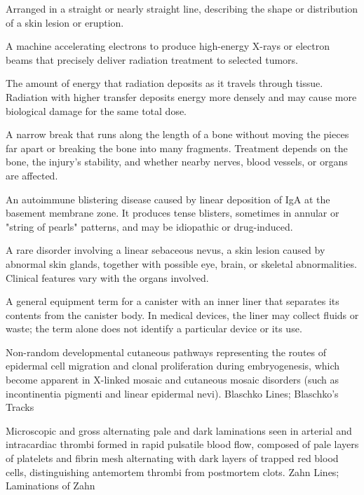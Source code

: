  Arranged in a straight or nearly straight line, describing the shape or distribution of a skin lesion or eruption.

 A machine accelerating electrons to produce high-energy X-rays or electron beams that precisely deliver radiation treatment to selected tumors.

 The amount of energy that radiation deposits as it travels through tissue. Radiation with higher transfer deposits energy more densely and may cause more biological damage for the same total dose.

 A narrow break that runs along the length of a bone without moving the pieces far apart or breaking the bone into many fragments. Treatment depends on the bone, the injury's stability, and whether nearby nerves, blood vessels, or organs are affected.

 An autoimmune blistering disease caused by linear deposition of IgA at the
basement membrane zone. It produces tense blisters, sometimes in annular or "string of pearls" patterns, and may be
idiopathic or drug-induced.

 A rare disorder involving a linear sebaceous nevus, a skin lesion caused by abnormal skin glands, together with possible eye, brain, or skeletal abnormalities. Clinical features vary with the organs involved.

 A general equipment term for a canister with an inner liner that separates its contents from the canister body. In medical devices, the liner may collect fluids or waste; the term alone does not identify a particular device or its use.

 Non-random developmental cutaneous pathways representing the routes of epidermal cell migration and clonal proliferation during embryogenesis, which become apparent in X-linked mosaic and cutaneous mosaic disorders (such as incontinentia pigmenti and linear epidermal nevi).
\synonyms
Blaschko Lines; Blaschko's Tracks

 Microscopic and gross alternating pale and dark laminations seen in arterial and intracardiac thrombi formed in rapid pulsatile blood flow, composed of pale layers of platelets and fibrin mesh alternating with dark layers of trapped red blood cells, distinguishing antemortem thrombi from postmortem clots.
\synonyms
Zahn Lines; Laminations of Zahn

